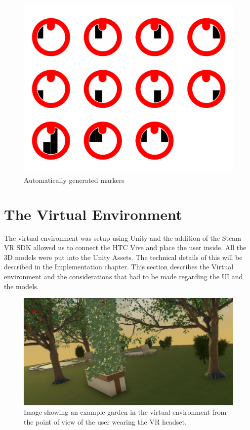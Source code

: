 \begin{figure}[H]
	\centering
	\includegraphics[width=0.7\linewidth]{figure/Analysis/result}
	\caption{Automatically generated markers}
	\label{fig:result}
\end{figure}


\section{The Virtual Environment}
The virtual environment was setup using Unity and the addition of the Steam VR SDK allowed us to connect the HTC Vive and place the user inside. All the 3D models were put into the Unity Assets. The technical details of this will be described in the Implementation chapter. This section describes the Virtual environment and the considerations that had to be made regarding the UI and the models.

\begin{figure}[H]
	\centering
	\includegraphics[width=0.9\linewidth]{figure/Design/vrPov.png}
	\caption{Image showing an example garden in the virtual environment from the point of view of the user wearing the VR headset.}
	\label{fig:result}
\end{figure}


